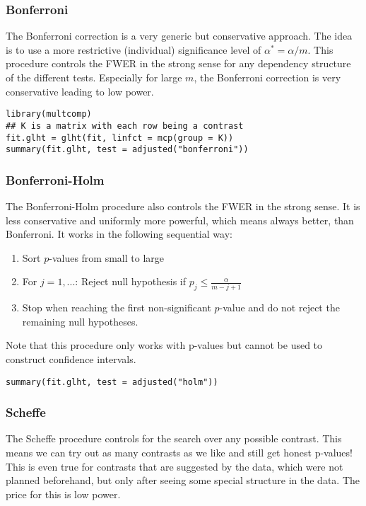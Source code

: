 \subsubsection{Bonferroni}

The Bonferroni correction is a very generic but conservative approach. The idea is to use a more restrictive (individual) significance level of $\alpha^* = \alpha / m$. This procedure controls the FWER in the strong sense for any dependency structure of the different tests. Especially for large $m$, the Bonferroni correction is very conservative leading to low power.

\begin{lstlisting}
library(multcomp)
## K is a matrix with each row being a contrast
fit.glht = glht(fit, linfct = mcp(group = K))
summary(fit.glht, test = adjusted("bonferroni"))
\end{lstlisting}

\subsubsection{Bonferroni-Holm}

The Bonferroni-Holm procedure also controls the FWER in the strong sense. It is less conservative and uniformly more powerful, which means always better, than Bonferroni. It works in the following sequential way:
\begin{enumerate}
	\item Sort $p$-values from small to large
	\item For $j = 1,...$: Reject null hypothesis if $p_j \leq \frac{\alpha}{m-j+1}$
	\item Stop when reaching the first non-significant $p$-value and do not reject the remaining null hypotheses.
\end{enumerate}

Note that this procedure only works with p-values but cannot be used to construct confidence intervals.
\begin{lstlisting}
summary(fit.glht, test = adjusted("holm"))
\end{lstlisting}

\subsubsection{Scheffe}

The Scheffe procedure controls for the search over any possible contrast. This means we can try out as many contrasts as we like and still get honest p-values! This is even true for contrasts that are suggested by the data, which were not planned beforehand, but only after seeing some special structure in the data. The price for this is low power. \medskip

